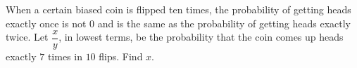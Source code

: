 When a certain biased coin is flipped ten times, the probability of getting heads exactly once is not $0$ and is the same as the probability of getting heads exactly twice. Let $\dfrac xy$, in lowest terms, be the probability that the coin comes up heads exactly $7$ times in $10$ flips. Find $x$.

